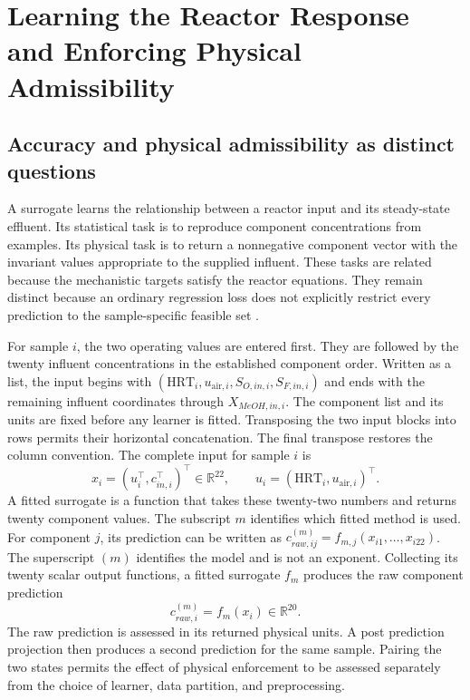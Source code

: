 \chapter{Learning the Reactor Response and Enforcing Physical Admissibility}
\label{ch:projection}

\section{Accuracy and physical admissibility as distinct questions}

A surrogate learns the relationship between a reactor input and its steady-state effluent. Its statistical task is to reproduce component concentrations from examples. Its physical task is to return a nonnegative component vector with the invariant values appropriate to the supplied influent. These tasks are related because the mechanistic targets satisfy the reactor equations. They remain distinct because an ordinary regression loss does not explicitly restrict every prediction to the sample-specific feasible set \citep{Kashinath2021,Hansen2024}.

For sample $i$, the two operating values are entered first. They are followed by the twenty influent concentrations in the established component order. Written as a list, the input begins with $(\mathrm{HRT}_i,u_{\mathrm{air},i},S_{O,in,i},S_{F,in,i})$ and ends with the remaining influent coordinates through $X_{MeOH,in,i}$. The component list and its units are fixed before any learner is fitted. Transposing the two input blocks into rows permits their horizontal concatenation. The final transpose restores the column convention. The complete input for sample $i$ is
\begin{equation}
x_i=(u_i^\top,c_{in,i}^\top)^\top\in\mathbb{R}^{22},\qquad
u_i=(\mathrm{HRT}_i,u_{\mathrm{air},i})^\top.
\label{eq:surrogate_input_vector}
\end{equation}
A fitted surrogate is a function that takes these twenty-two numbers and returns twenty component values. The subscript $m$ identifies which fitted method is used. For component $j$, its prediction can be written as $c_{raw,ij}^{(m)}=f_{m,j}(x_{i1},\ldots,x_{i22})$. The superscript $(m)$ identifies the model and is not an exponent. Collecting its twenty scalar output functions, a fitted surrogate $f_m$ produces the raw component prediction
\begin{equation}
c_{raw,i}^{(m)}=f_m(x_i)\in\mathbb{R}^{20}.
\label{eq:surrogate_raw_state}
\end{equation}
The raw prediction is assessed in its returned physical units. A post prediction projection then produces a second prediction for the same sample. Pairing the two states permits the effect of physical enforcement to be assessed separately from the choice of learner, data partition, and preprocessing.

